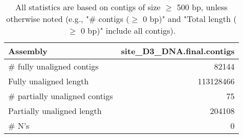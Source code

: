 \documentclass[12pt,a4paper]{article}
\begin{document}
\begin{table}[ht]
\begin{center}
\caption{All statistics are based on contigs of size $\geq$ 500 bp, unless otherwise noted (e.g., "\# contigs ($\geq$ 0 bp)" and "Total length ($\geq$ 0 bp)" include all contigs).}
\begin{tabular}{|l*{1}{|r}|}
\hline
Assembly & site\_D3\_DNA.final.contigs \\ \hline
\# fully unaligned contigs & 82144 \\ \hline
Fully unaligned length & 113128466 \\ \hline
\# partially unaligned contigs & 75 \\ \hline
Partially unaligned length & 204108 \\ \hline
\# N's & 0 \\ \hline
\end{tabular}
\end{center}
\end{table}
\end{document}
